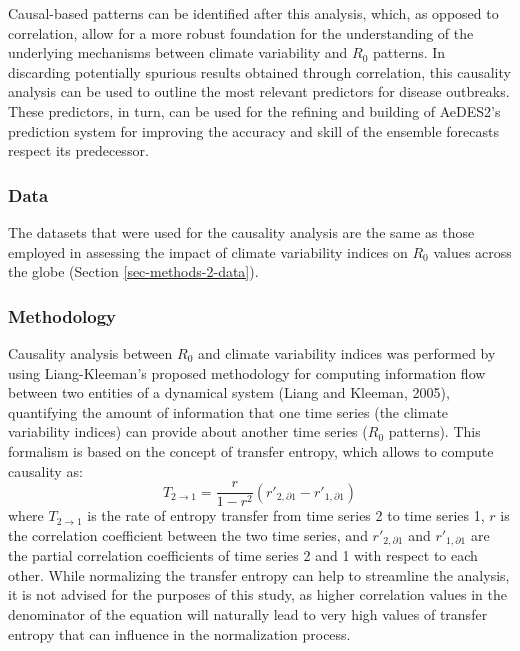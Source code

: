 \documentclass[fleqn,10pt]{wlscirep}
\begin{document}
  Causal-based patterns can be identified after this analysis, which, as opposed to correlation, allow for a more robust foundation for the understanding of the underlying mechanisms between climate variability and $R_0$ patterns. In discarding potentially spurious results obtained through correlation, this causality analysis can be used to outline the most relevant predictors for disease outbreaks. These predictors, in turn, can be used for the refining and building of AeDES2's prediction system for improving the accuracy and skill of the ensemble forecasts respect its predecessor.

  \subsubsection{Data} \label{sec-methods-3-data}

  The datasets that were used for the causality analysis are the same as those employed in assessing the impact of climate variability indices on $R_0$ values across the globe (Section \ref{sec-methods-2-data}).

  \subsubsection{Methodology} \label{sec-methods-3-methodology}

  Causality analysis between $R_0$ and climate variability indices was performed by using Liang-Kleeman's proposed methodology for computing information flow between two entities of a dynamical system (Liang and Kleeman, 2005), quantifying the amount of information that one time series (the climate variability indices) can provide about another time series ($R_0$ patterns). This formalism is based on the concept of transfer entropy, which allows to compute causality as:
  \begin{equation}
      T_{2 \rightarrow 1} = \frac{r}{1-r^2}(r'_{2,\partial 1} - r'_{1,\partial 1})
  \end{equation}
  where $T_{2 \rightarrow 1}$ is the rate of entropy transfer from time series 2 to time series 1, $r$ is the correlation coefficient between the two time series, and $r'_{2,\partial 1}$ and $r'_{1,\partial 1}$ are the partial correlation coefficients of time series 2 and 1 with respect to each other. While normalizing the transfer entropy can help to streamline the analysis, it is not advised for the purposes of this study, as higher correlation values in the denominator of the equation will naturally lead to very high values of transfer entropy that can influence in the normalization process.
\end{document}
